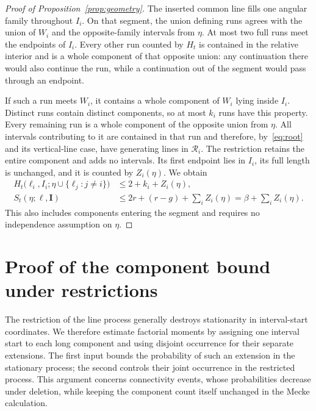 \documentclass[11pt,letterpaper]{article}
\begin{document}
\begin{proof}[Proof of Proposition~\ref{prop:geometry}]
The inserted common line fills one angular family throughout $I_i$. On that segment, the union defining runs agrees with the union of $W_i$ and the opposite-family intervals from $\eta$. At most two full runs meet the endpoints of $I_i$. Every other run counted by $H_t$ is contained in the relative interior and is a whole component of that opposite union: any continuation there would also continue the run, while a continuation out of the segment would pass through an endpoint.

If such a run meets $W_i$, it contains a whole component of $W_i$ lying inside $I_i$. Distinct runs contain distinct components, so at most $k_i$ runs have this property. Every remaining run is a whole component of the opposite union from $\eta$. All intervals contributing to it are contained in that run and therefore, by~\eqref{eq:root} and its vertical-line case, have generating lines in $\mathscr R_i$. The restriction retains the entire component and adds no intervals. Its first endpoint lies in $I_i$, its full length is unchanged, and it is counted by $Z_i(\eta)$. We obtain
\begin{equation}\label{eq:charge}
\begin{aligned}
 H_t\big(\ell_i,I_i;\eta\cup\{\ell_j:j\ne i\}\big)
   &\le2+k_i+Z_i(\eta),\\
 S_t(\eta;\boldsymbol\ell,\boldsymbol I)
   &\le2r+(r-g)+\sum_iZ_i(\eta)=\beta+\sum_iZ_i(\eta).
\end{aligned}
\end{equation}
This also includes components entering the segment and requires no independence assumption on $\eta$.
\end{proof}

\section{Proof of the component bound under restrictions}

The restriction of the line process generally destroys stationarity in interval-start coordinates. We therefore estimate factorial moments by assigning one interval start to each long component and using disjoint occurrence for their separate extensions. The first input bounds the probability of such an extension in the stationary process; the second controls their joint occurrence in the restricted process. This argument concerns connectivity events, whose probabilities decrease under deletion, while keeping the component count itself unchanged in the Mecke calculation.
\end{document}
